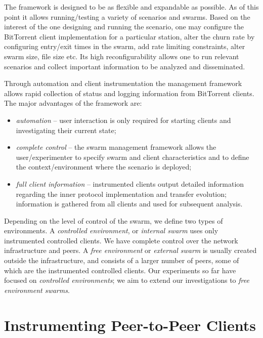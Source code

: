 The framework is designed to be as flexible and expandable as possible. As of
this point it allows running/testing a variety of scenarios and swarms. Based
on the interest of the one designing and running the scenario, one may
configure the BitTorrent client implementation for a particular station, alter
the churn rate by configuring entry/exit times in the swarm, add rate limiting
constraints, alter swarm size, file size etc. Its high reconfigurability
allows one to run relevant scenarios and collect important information to be
analyzed and disseminated.

Through automation and client instrumentation the management framework allows
rapid collection of status and logging information from BitTorrent clients.
The major advantages of the framework are:

\begin{itemize}
  \item \textit{automation} -- user interaction is only required for starting
  clients and investigating their current state;
  \item \textit{complete control} -- the swarm management framework allows the
  user/experimenter to specify swarm and client characteristics and to define
  the context/environment where the scenario is deployed;
  \item \textit{full client information} -- instrumented clients output
  detailed information regarding the inner protocol implementation and
  transfer evolution; information is gathered from all clients and used for
  subsequent analysis.
\end{itemize}

Depending on the level of control of the swarm, we define two types of
environments. A \textit{controlled environment}, or \textit{internal swarm}
uses only instrumented controlled clients. We have complete control over the
network infrastructure and peers. A \textit{free environment} or
\textit{external swarm} is usually created outside the infrastructure, and
consists of a larger number of peers, some of which are the instrumented
controlled clients. Our experiments so far have focused on \textit{controlled
environments}; we aim to extend our investigations to \textit{free environment
swarms}.

\section{Instrumenting Peer-to-Peer Clients}
\label{sec:deploy-instr}

